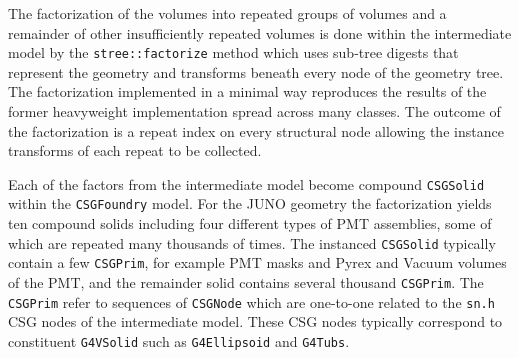 \documentclass{webofc}
\begin{document}
The factorization of the volumes into repeated groups of volumes and a remainder of 
other insufficiently repeated volumes is done within the intermediate model by the 
{\tt stree::factorize} method which uses sub-tree digests that represent the geometry and transforms 
beneath every node of the geometry tree. The factorization implemented in a minimal way 
reproduces the results of the former heavyweight implementation spread across many classes. 
The outcome of the factorization is a repeat index on every structural node allowing 
the instance transforms of each repeat to be collected. 

Each of the factors from the intermediate model become 
compound {\tt CSGSolid} within the {\tt CSGFoundry} model.  
For the JUNO geometry the factorization yields ten compound solids including four 
different types of PMT assemblies, some of which are repeated many thousands of times. 
The instanced {\tt CSGSolid} typically contain a few {\tt CSGPrim}, for example PMT masks and Pyrex and Vacuum volumes of the PMT,
and the remainder solid contains several thousand {\tt CSGPrim}. 
The {\tt CSGPrim} refer to sequences of {\tt CSGNode} which are one-to-one related to the {\tt sn.h} CSG nodes
of the intermediate model. These CSG nodes typically correspond to constituent {\tt G4VSolid} such as {\tt G4Ellipsoid} and {\tt G4Tubs}. 
%
%
\end{document}
